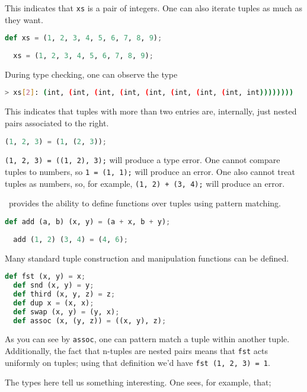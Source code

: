 This indicates that \lstinline{xs} is a pair of integers. One can also iterate tuples as much as they want.

\begin{lstlisting}[language=Python]
  def xs = (1, 2, 3, 4, 5, 6, 7, 8, 9);
  
  xs = (1, 2, 3, 4, 5, 6, 7, 8, 9);
\end{lstlisting}

During type checking, one can observe the type

\begin{lstlisting}[language=bash]
  > xs[2]: (int, (int, (int, (int, (int, (int, (int, (int, int))))))))
\end{lstlisting}

This indicates that tuples with more than two entries are, internally, just nested pairs associated to the right.

\begin{lstlisting}[language=Python]
  (1, 2, 3) = (1, (2, 3));
\end{lstlisting}

\lstinline{(1, 2, 3) = ((1, 2), 3);} will produce a type error. One cannot compare tuples to numbers, so \lstinline{1 = (1, 1);} will produce an error. One also cannot treat tuples as numbers, so, for example, \lstinline{(1, 2) + (3, 4);} will produce an error.

\vampir\ provides the ability to define functions over tuples using pattern matching.

\begin{lstlisting}[language=Python]
  def add (a, b) (x, y) = (a + x, b + y);
  
  add (1, 2) (3, 4) = (4, 6);
\end{lstlisting}

Many standard tuple construction and manipulation functions can be defined.

\begin{lstlisting}[language=Python]
  def fst (x, y) = x;
  def snd (x, y) = y;
  def third (x, y, z) = z;
  def dup x = (x, x);
  def swap (x, y) = (y, x);
  def assoc (x, (y, z)) = ((x, y), z);
\end{lstlisting}

As you can see by \lstinline{assoc}, one can pattern match a tuple within another tuple. Additionally, the fact that n-tuples are nested pairs means that \lstinline{fst} acts uniformly on tuples; using that definition we'd have \lstinline{fst (1, 2, 3) = 1}.

The types here tell us something interesting. One sees, for example, that;

